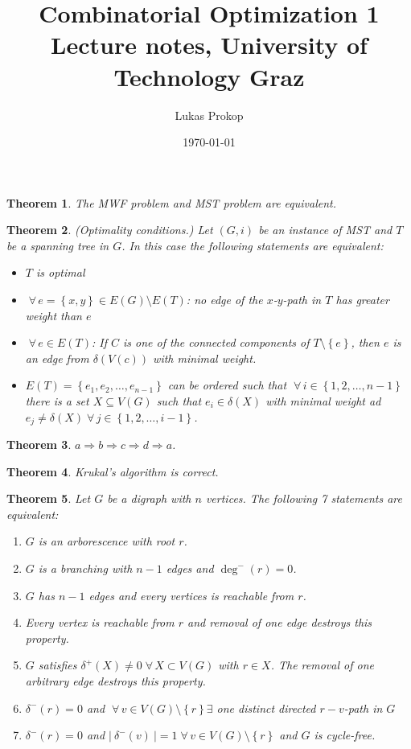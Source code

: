 \documentclass{article}
\title{
  Combinatorial Optimization 1 \\
  \large{Lecture notes, University of Technology Graz}
}
\date{\today}
\author{Lukas Prokop}
\newtheorem{theorem}{Theorem}
\newcommand{\card}[1]{\left|\:\!#1\:\!\right|}
\newcommand{\set}[1]{\left\{#1\right\}}
\newcommand{\gath}[2]{$#1$-$#2$-path} %
\newcommand{\fall}{\;\forall\,}
\begin{document}
\begin{theorem}\label{proposition-2.1}
  The MWF problem and MST problem are equivalent.
\end{theorem}
\begin{theorem}\label{satz-2.2}
(Optimality conditions.)
Let $(G, i)$ be an instance of MST and $T$ be a spanning tree in $G$. In this case the following statements are equivalent:
\begin{itemize}
  \item $T$ is optimal
  \item $\fall e = \set{x, y} \in E(G) \setminus E(T)$: no edge of the \gath xy in $T$ has greater weight than $e$
  \item $\fall e \in E(T)$: If $C$ is one of the connected components of $T \setminus \set{e}$, then $e$ is an edge from $\delta(V(c))$ with minimal weight.
  \item $E(T) = \set{e_1, e_2, \ldots, e_{n-1}}$ can be ordered such that $\fall i \in \set{1, 2, \ldots, n-1}$ there is a set $X \subseteq V(G)$ such that $e_i \in \delta(X)$ with minimal weight ad $e_j \neq \delta(X) \fall j \in \set{1, 2, \ldots, i-1}$.
\end{itemize}
\end{theorem}
\begin{theorem}
  $a \Rightarrow b \Rightarrow c \Rightarrow d \Rightarrow a$.
\end{theorem}
\begin{theorem}\label{satz-2.3}
  Krukal's algorithm is correct.
\end{theorem}
\begin{theorem}\label{satz-2.4}
  Let $G$ be a digraph with $n$ vertices. The following 7 statements are equivalent:
\begin{enumerate}
  \item $G$ is an arborescence with root $r$.
  \item $G$ is a branching with $n-1$ edges and $\operatorname{deg}^-(r) = 0$.
  \item $G$ has $n-1$ edges and every vertices is reachable from $r$.
  \item Every vertex is reachable from $r$ and removal of one edge destroys this property.
  \item $G$ satisfies $\delta^+(X) \neq 0 \fall X \subset V(G)$ with $r \in X$. The removal of one arbitrary edge destroys this property.
  \item $\delta^-(r) = 0$ and $\fall v \in V(G) \setminus \set{r} \exists$ one distinct directed $r-v$-path in $G$
  \item $\delta^-(r) = 0$ and $\card{\delta^-(v)} = 1 \fall v \in V(G) \setminus \set{r}$ and $G$ is cycle-free.
\end{enumerate}
\end{theorem}
\end{document}
